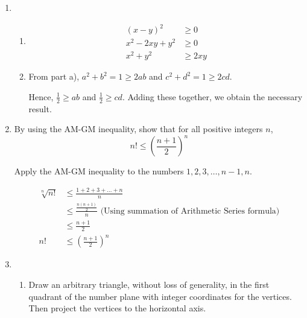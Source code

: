 \documentclass[11pt, a4paper, oneside]{exam}
\theoremstyle{definition}\newtheorem{define}{Definition}[section]
\theoremstyle{remark}\newtheorem{remark}{Remark}
\theoremstyle{definition}\newtheorem{example}{Example}[subsection]
\theoremstyle{definition}\newtheorem{notation}{Notation}[section]
\theoremstyle{definition}\newtheorem{theorem}{Theorem}[section]
\theoremstyle{definition}\newtheorem{corollary}{Corollary}[section]
\begin{document}
\begin{enumerate}
\item
\begin{enumerate}
\item 
\begin{align*}
(x-y)^2 & \geq 0\\
x^2 - 2xy + y^2 & \geq 0\\
x^2 + y^2 & \geq 2xy
\end{align*}
\item
From part a), $a^2 + b^2 = 1 \geq 2ab$ and $c^2 + d^2 = 1 \geq 2cd$.

Hence, $\frac{1}{2} \geq ab$ and $\frac{1}{2} \geq cd$. Adding these together, we obtain the necessary result.
\end{enumerate}




\item By using the AM-GM inequality, show that for all positive integers $n$, 
\[ n! \leq \left(\frac{n+1}{2}\right)^n \]

Apply the AM-GM inequality to the numbers $1,2,3,\ldots,n-1,n$.

\begin{align*}
\sqrt[n]{n!} & \leq \frac{1+2+3+\ldots+n}{n}\\
& \leq \frac{\frac{n(n+1)}{2}}{n} \mbox{ (Using summation of Arithmetic Series formula)}\\
& \leq \frac{n+1}{2}\\
n! &\leq \left(\frac{n+1}{2}\right)^n
\end{align*}

\item 
\begin{enumerate}
\item


Draw an arbitrary triangle, without loss of generality, in the first quadrant of the number plane with integer coordinates for the vertices. Then project the vertices to the horizontal axis.

\end{enumerate}
\end{enumerate}
\end{document}
